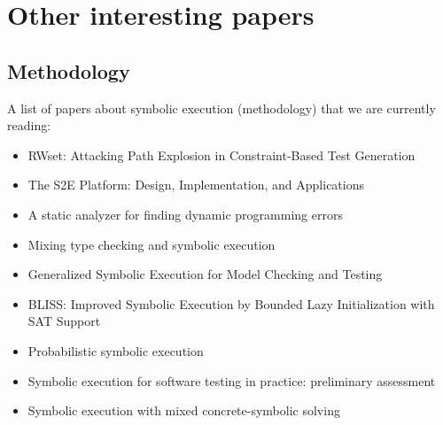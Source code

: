 \documentclass[10pt, a4paper]{article}
\begin{document}
\section{Other interesting papers}

\subsection{Methodology}
A list of papers about symbolic execution (methodology) that we are currently reading:
\begin{itemize}
  \item \cite{BCE-TACAS08} RWset: Attacking Path Explosion in Constraint-Based Test Generation
  \item \cite{CKC-TOCS12} The S2E Platform: Design, Implementation, and Applications
  \item \cite{BPS-SPE00} A static analyzer for finding dynamic programming errors
  \item \cite{KCF-PLDI10} Mixing type checking and symbolic execution
  \item \cite{KPV-TACAS03} Generalized Symbolic Execution for Model Checking and Testing
  \item \cite{BLISS-TSE15} BLISS: Improved Symbolic Execution by Bounded Lazy Initialization with SAT Support
  \item \cite{GDV-ISSTA12} Probabilistic symbolic execution
  \item \cite{CGK-ICSE11} Symbolic execution for software testing in practice: preliminary assessment
  \item \cite{PRV-ISSTA11} Symbolic execution with mixed concrete-symbolic solving
\end{itemize}
\end{document}
